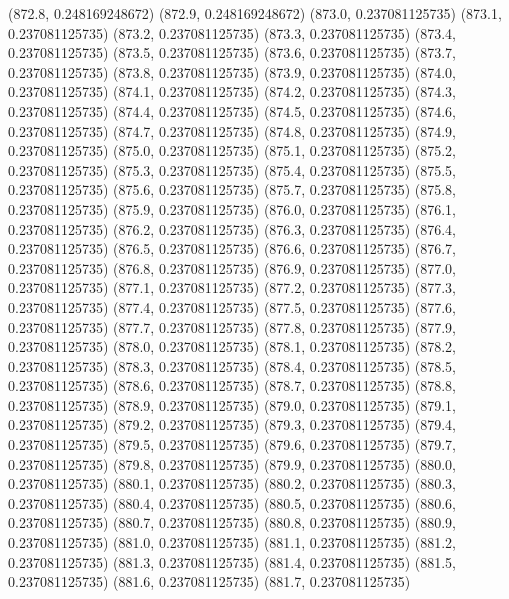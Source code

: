 {					(872.8, 0.248169248672)
					(872.9, 0.248169248672)
					(873.0, 0.237081125735)
					(873.1, 0.237081125735)
					(873.2, 0.237081125735)
					(873.3, 0.237081125735)
					(873.4, 0.237081125735)
					(873.5, 0.237081125735)
					(873.6, 0.237081125735)
					(873.7, 0.237081125735)
					(873.8, 0.237081125735)
					(873.9, 0.237081125735)
					(874.0, 0.237081125735)
					(874.1, 0.237081125735)
					(874.2, 0.237081125735)
					(874.3, 0.237081125735)
					(874.4, 0.237081125735)
					(874.5, 0.237081125735)
					(874.6, 0.237081125735)
					(874.7, 0.237081125735)
					(874.8, 0.237081125735)
					(874.9, 0.237081125735)
					(875.0, 0.237081125735)
					(875.1, 0.237081125735)
					(875.2, 0.237081125735)
					(875.3, 0.237081125735)
					(875.4, 0.237081125735)
					(875.5, 0.237081125735)
					(875.6, 0.237081125735)
					(875.7, 0.237081125735)
					(875.8, 0.237081125735)
					(875.9, 0.237081125735)
					(876.0, 0.237081125735)
					(876.1, 0.237081125735)
					(876.2, 0.237081125735)
					(876.3, 0.237081125735)
					(876.4, 0.237081125735)
					(876.5, 0.237081125735)
					(876.6, 0.237081125735)
					(876.7, 0.237081125735)
					(876.8, 0.237081125735)
					(876.9, 0.237081125735)
					(877.0, 0.237081125735)
					(877.1, 0.237081125735)
					(877.2, 0.237081125735)
					(877.3, 0.237081125735)
					(877.4, 0.237081125735)
					(877.5, 0.237081125735)
					(877.6, 0.237081125735)
					(877.7, 0.237081125735)
					(877.8, 0.237081125735)
					(877.9, 0.237081125735)
					(878.0, 0.237081125735)
					(878.1, 0.237081125735)
					(878.2, 0.237081125735)
					(878.3, 0.237081125735)
					(878.4, 0.237081125735)
					(878.5, 0.237081125735)
					(878.6, 0.237081125735)
					(878.7, 0.237081125735)
					(878.8, 0.237081125735)
					(878.9, 0.237081125735)
					(879.0, 0.237081125735)
					(879.1, 0.237081125735)
					(879.2, 0.237081125735)
					(879.3, 0.237081125735)
					(879.4, 0.237081125735)
					(879.5, 0.237081125735)
					(879.6, 0.237081125735)
					(879.7, 0.237081125735)
					(879.8, 0.237081125735)
					(879.9, 0.237081125735)
					(880.0, 0.237081125735)
					(880.1, 0.237081125735)
					(880.2, 0.237081125735)
					(880.3, 0.237081125735)
					(880.4, 0.237081125735)
					(880.5, 0.237081125735)
					(880.6, 0.237081125735)
					(880.7, 0.237081125735)
					(880.8, 0.237081125735)
					(880.9, 0.237081125735)
					(881.0, 0.237081125735)
					(881.1, 0.237081125735)
					(881.2, 0.237081125735)
					(881.3, 0.237081125735)
					(881.4, 0.237081125735)
					(881.5, 0.237081125735)
					(881.6, 0.237081125735)
					(881.7, 0.237081125735)
}
